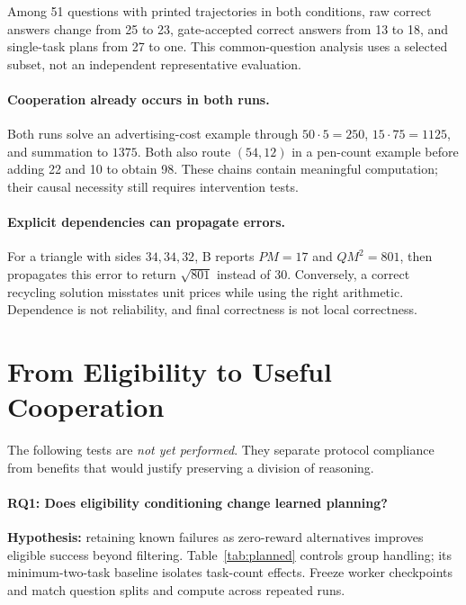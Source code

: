 \documentclass[11pt]{article}
\begin{document}
Among 51 questions with printed trajectories in both conditions, raw correct answers change from 25 to 23, gate-accepted correct answers from 13 to 18, and single-task plans from 27 to one. This common-question analysis uses a selected subset, not an independent representative evaluation.

\paragraph{Cooperation already occurs in both runs.}
Both runs solve an advertising-cost example through $50\cdot5=250$, $15\cdot75=1125$, and summation to $1375$. Both also route $(54,12)$ in a pen-count example before adding 22 and 10 to obtain 98. These chains contain meaningful computation; their causal necessity still requires intervention tests.

\paragraph{Explicit dependencies can propagate errors.}
For a triangle with sides $34,34,32$, B reports $PM=17$ and $QM^2=801$, then propagates this error to return $\sqrt{801}$ instead of 30. Conversely, a correct recycling solution misstates unit prices while using the right arithmetic. Dependence is not reliability, and final correctness is not local correctness.

\section{From Eligibility to Useful Cooperation}
The following tests are \emph{not yet performed}. They separate protocol compliance from benefits that would justify preserving a division of reasoning.

\paragraph{RQ1: Does eligibility conditioning change learned planning?}
\textbf{Hypothesis:} retaining known failures as zero-reward alternatives improves eligible success beyond filtering. Table~\ref{tab:planned} controls group handling; its minimum-two-task baseline isolates task-count effects. Freeze worker checkpoints and match question splits and compute across repeated runs.
\end{document}

